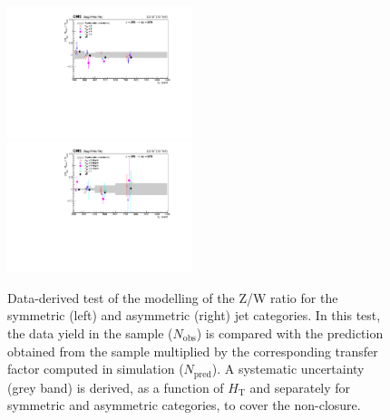 \begin{figure}[tbhp]
    \caption{ 
  Data-derived test of the modelling of the Z/W ratio for the symmetric (left) and asymmetric (right) jet categories. 
  In this test, the data yield in the \mmj sample ($N_{\mathrm{obs}}$) 
  is compared with the prediction obtained from the \mj sample multiplied by the corresponding 
  transfer factor computed in simulation ($N_{\mathrm{pred}}$). 
  A systematic uncertainty (grey band) is derived, as a function of $H_{\mathrm{T}}$ and separately for symmetric and asymmetric categories, 
  to cover the non-closure. 
    \label{fig:CT-ZWratio} }
  \begin{center}
     \includegraphics[width=0.48\textwidth]{mu_mumusym_half_noFit_aux} ~~
     \includegraphics[width=0.48\textwidth]{mu_mumuasym_half_noFit_aux}
  \end{center}
\end{figure}





